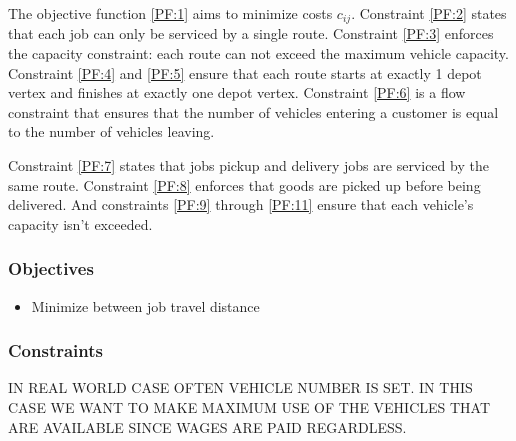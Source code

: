 The objective function \eqref{PF:1} aims to minimize costs $c_{ij}$. Constraint \eqref{PF:2} states that each job can only be serviced by a single route. Constraint \eqref{PF:3} enforces the capacity constraint: each route can not exceed the maximum vehicle capacity. Constraint \eqref{PF:4} and \eqref{PF:5} ensure that each route starts at exactly 1 depot vertex and finishes at exactly one depot vertex. Constraint \eqref{PF:6} is a flow constraint that ensures that the number of vehicles entering a customer is equal to the number of vehicles leaving.

Constraint \eqref{PF:7} states that jobs pickup and delivery jobs are serviced by the same route. Constraint \eqref{PF:8} enforces that goods are picked up before being delivered. And constraints \eqref{PF:9} through \eqref{PF:11} ensure that each vehicle's capacity isn't exceeded.


\subsubsection{Objectives}

\begin{itemize}
	\item Minimize between job travel distance
\end{itemize}

\subsubsection{Constraints}


IN REAL WORLD CASE OFTEN VEHICLE NUMBER IS SET. IN THIS CASE WE WANT TO MAKE MAXIMUM USE OF THE VEHICLES THAT ARE AVAILABLE SINCE WAGES ARE PAID REGARDLESS.




